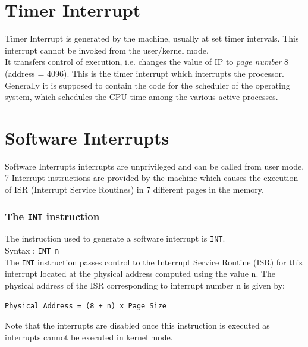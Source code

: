 \documentclass[11pt]{report}
\begin{document}
\section{Timer Interrupt }
Timer Interrupt is generated by the machine, usually at set timer intervals. This interrupt cannot be invoked from the user/kernel mode.\\

It transfers control of execution, i.e. changes the value of IP to \textit{page number} 8 (address = 4096). This is the timer interrupt which interrupts the processor. Generally it is supposed to contain the code for the scheduler of the operating system, which schedules the CPU time among the various active processes.

\section{Software Interrupts }
Software Interrupts interrupts are unprivileged and can be called from user mode. 7 Interrupt instructions are provided by the machine which causes the execution of ISR (Interrupt Service Routines) in 7 different pages in the memory. 

\subsubsection{The \texttt{INT} instruction}
The instruction used to generate a software interrupt is \texttt{INT}.\\
Syntax : \texttt{INT n}\\
The \texttt{INT} instruction passes control to the Interrupt Service Routine (ISR) for this interrupt located at the physical address computed using the value n. The physical address of the ISR corresponding to interrupt number n is given by: 
\begin{verbatim}
Physical Address = (8 + n) x Page Size
\end{verbatim}
Note that the interrupts are disabled once this instruction is executed as interrupts cannot be executed in kernel mode.\\
\end{document}
